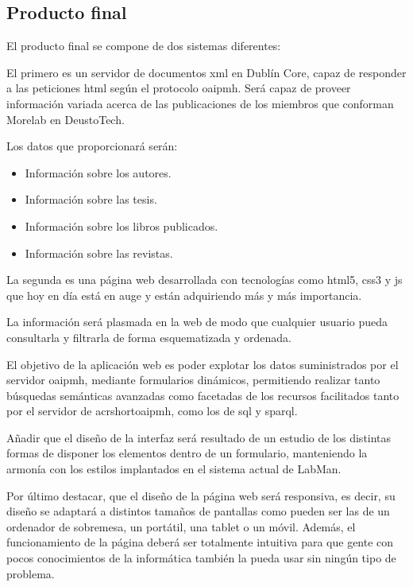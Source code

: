 \subsection{Producto final}

El producto final se compone de dos sistemas diferentes:

El primero es un servidor de documentos \acrshort{xml}\cite{XML} en Dublín Core, capaz de responder a las peticiones \acrshort{html} según el protocolo \acrshort{oaipmh}. Será capaz de proveer información variada acerca de las publicaciones de los miembros que conforman Morelab en DeustoTech.

Los datos que proporcionará serán:

\begin{itemize}
	\item Información sobre los autores.
	\item Información sobre las tesis.
	\item Información sobre los libros publicados.
	\item Información sobre las revistas.
\end{itemize}

La segunda es una página web desarrollada con tecnologías como \acrshort{html}5, \acrshort{css}3 y \acrshort{js} que hoy en día está en auge y están adquiriendo más y más importancia.

La información será plasmada en la web de modo que cualquier usuario pueda consultarla y filtrarla de forma esquematizada y ordenada.

El objetivo de la aplicación web es poder explotar los datos suministrados por el servidor \acrshort{oaipmh}, mediante formularios dinámicos, permitiendo realizar tanto búsquedas semánticas avanzadas como facetadas de los recursos facilitados tanto por el servidor de acrshort{oaipmh}, como los de \acrshort{sql} y \acrshort{sparql}.

Añadir que el diseño de la interfaz será resultado de un estudio de los distintas formas de disponer los elementos dentro de un formulario, manteniendo la armonía con los estilos implantados en el sistema actual de LabMan.

Por último destacar, que el diseño de la página web será responsiva, es decir, su diseño se adaptará a distintos tamaños de pantallas como pueden ser las de un ordenador de sobremesa, un portátil, una tablet o un móvil. Además, el funcionamiento de la página deberá ser totalmente intuitiva para que gente con pocos conocimientos de la informática también la pueda usar sin ningún tipo de problema.